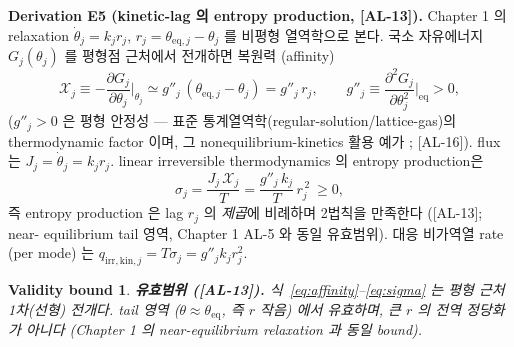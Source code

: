 \documentclass[11pt,a4paper]{article}
\newtheorem*{boundbox}{Validity bound}
\newcommand{\eq}{\mathrm{eq}}
\newcommand{\irr}{\mathrm{irr}}
\newcommand{\kin}{\mathrm{kin}}
\newcommand{\AL}[1]{\textsf{[AL-#1]}}
\begin{document}
\textbf{Derivation E5 (kinetic-lag 의 entropy production, \AL{13}).} Chapter 1 의 relaxation
$\dot\theta_j=k_j r_j$, $r_j=\theta_{\eq,j}-\theta_j$ 를 비평형 열역학으로 본다. 국소 자유에너지
$G_j(\theta_j)$ 를 평형점 근처에서 전개하면 복원력 (affinity)
\begin{equation}
\mathcal X_j\equiv-\frac{\partial G_j}{\partial\theta_j}\Big|_{\theta_j}\simeq g''_j\,(\theta_{\eq,j}-\theta_j)=g''_j\,r_j,
\qquad g''_j\equiv\frac{\partial^2 G_j}{\partial\theta_j^2}\Big|_{\eq}>0,
\label{eq:affinity}
\end{equation}
($g''_j>0$ 은 평형 안정성 — 표준 통계열역학(regular-solution/lattice-gas)의 thermodynamic factor 이며, 그 nonequilibrium-kinetics 활용 예가 \cite{bazant2013}; \AL{16}). flux 는
$J_j=\dot\theta_j=k_j r_j$. linear irreversible thermodynamics 의 entropy production은
\cite{degrootmazur1962,onsager1931}
\begin{equation}
\boxed{\;\sigma_j=\frac{J_j\,\mathcal X_j}{T}=\frac{g''_j\,k_j}{T}\,r_j^{\,2}\ \ge 0,\;}
\label{eq:sigma}
\end{equation}
즉 entropy production 은 lag $r_j$ 의 \emph{제곱}에 비례하며 2법칙을 만족한다 (\AL{13}; near-
equilibrium tail 영역, Chapter 1 AL-5 와 동일 유효범위). 대응 비가역열 rate (per mode) 는
$q_{\irr,\kin,j}=T\sigma_j=g''_j k_j r_j^2$.

\begin{boundbox}
\textbf{유효범위 (\AL{13}).} 식~\eqref{eq:affinity}--\eqref{eq:sigma} 는 평형 근처 1차(선형)
전개다. tail 영역 ($\theta\approx\theta_\eq$, 즉 $r$ 작음) 에서 유효하며, 큰 $r$ 의 전역
정당화가 아니다 (Chapter 1 의 near-equilibrium relaxation 과 동일 bound).
\end{boundbox}

\end{document}
